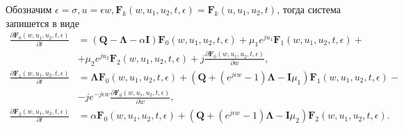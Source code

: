 Обозначим $\epsilon = \sigma,   u= \epsilon w,   \boldsymbol{F}_{k}(w,u_{1},u_{2},t,\epsilon) = \boldsymbol{F}_{k}(u,u_{1},u_{2},t)$, тогда система запишется в виде
\begin{equation} \label{asymptotic_equations_twodim_map}
	\begin{split}
		\frac{{\partial \boldsymbol{F}_{0}(w,u_{1},u_{2},t,\epsilon)}}{{\partial t}} &= (\boldsymbol{Q}-\boldsymbol{\Lambda}-\alpha\boldsymbol{I})\boldsymbol{F}_{0}(w,u_{1},u_{2},t,\epsilon) + \mu_{1} e^{ju_{1}}\boldsymbol{F}_{1}(w,u_{1},u_{2},t,\epsilon)  + \\  &+ \mu_{2}e^{ju_{2}}\boldsymbol{F}_{2}(w,u_{1},u_{2},t,\epsilon) + j
	\frac{{\partial \boldsymbol{F}_{0}(w,u_{1},u_{2},t,\epsilon)}}{{\partial w}},
	\\
	\frac{{\partial \boldsymbol{F}_{1}(w,u_{1},u_{2},t,\epsilon)}}{{\partial t}} &= \boldsymbol{\Lambda} \boldsymbol{F}_{0}(w,u_{1},u_{2},t,\epsilon) +  (\boldsymbol{Q}+(e^{j\epsilon w}-1)\boldsymbol{\Lambda} - \boldsymbol{I}\mu_{1})\boldsymbol{F}_{1}(w,u_{1},u_{2},t,\epsilon) -\\ &- j e^{-j\epsilon w}
	\frac{{\partial \boldsymbol{F}_{0}(w,u_{1},u_{2},t,\epsilon)}}{{\partial w}},
	\\
	\frac{{\partial \boldsymbol{F}_{2}(w,u_{1},u_{2},t,\epsilon)}}{{\partial t}} &= \alpha \boldsymbol{F}_{0}(w,u_{1},u_{2},t,\epsilon) + (\boldsymbol{Q}+(e^{j\epsilon w}-1)\boldsymbol{\Lambda} - \boldsymbol{I}\mu_{2})\boldsymbol{F}_{2}(w,u_{1},u_{2},t,\epsilon).
	\end{split}
\end{equation}  

